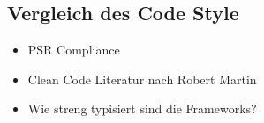 \subsection{Vergleich des Code Style}
\begin{itemize}
    \item PSR Compliance
    \item Clean Code Literatur nach Robert Martin
    \item Wie streng typisiert sind die Frameworks?
\end{itemize}
